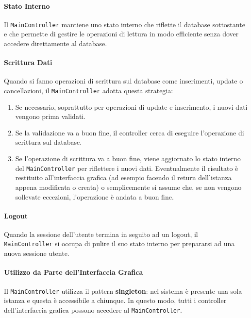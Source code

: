 \documentclass[12pt,a4paper]{article}
\begin{document}
\paragraph{Stato Interno}

Il \texttt{MainController} mantiene uno stato interno che riflette il database sottostante
e che permette di gestire le operazioni di lettura in modo efficiente senza dover accedere
direttamente al database.

\paragraph{Scrittura Dati}

Quando si fanno operazioni di scrittura sul database come inserimenti, update o
cancellazioni, il \texttt{MainController} adotta questa strategia:

\begin{enumerate}
    \item Se necessario, soprattutto per operazioni di update e inserimento, i nuovi dati
        vengono prima validati.
    \item Se la validazione va a buon fine, il controller cerca di eseguire l'operazione di
        scrittura sul database.
    \item Se l'operazione di scrittura va a buon fine, viene aggiornato lo stato interno
        del \texttt{MainController} per riflettere i nuovi dati. Eventualmente il risultato
        è restituito all'interfaccia grafica (ad esempio facendo il return dell'istanza
        appena modificata o creata) o semplicemente si assume che, se non vengono sollevate
        eccezioni, l'operazione è andata a buon fine.
\end{enumerate}

\paragraph{Logout}

Quando la sessione dell'utente termina in seguito ad un logout, il
\texttt{MainController} si occupa di pulire il suo stato interno per prepararsi ad una
nuova sessione utente.

\paragraph{Utilizzo da Parte dell'Interfaccia Grafica}

Il \texttt{MainController} utilizza il pattern \textbf{singleton}: nel sistema è presente
una sola istanza e questa è accessibile a chiunque. In questo modo, tutti i controller
dell'interfaccia grafica possono accedere al \texttt{MainController}.
\end{document}
